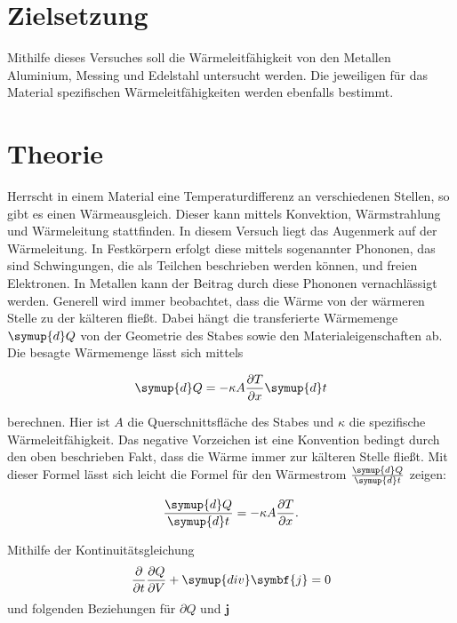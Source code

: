 \section{Zielsetzung}
Mithilfe dieses Versuches soll die Wärmeleitfähigkeit von den Metallen Aluminium, Messing und Edelstahl untersucht werden.
Die jeweiligen für das Material spezifischen Wärmeleitfähigkeiten werden ebenfalls bestimmt.


\section{Theorie}
\label{sec:Theorie}

Herrscht in einem Material eine Temperaturdifferenz an verschiedenen Stellen, so gibt es einen Wärmeausgleich.
Dieser kann mittels Konvektion, Wärmstrahlung und Wärmeleitung stattfinden. In diesem Versuch liegt das Augenmerk auf der Wärmeleitung.
In Festkörpern erfolgt diese mittels sogenannter Phononen, das sind Schwingungen, die als Teilchen beschrieben werden können, und freien Elektronen.
In Metallen kann der Beitrag durch diese Phononen vernachlässigt werden.
Generell wird immer beobachtet, dass die Wärme von der wärmeren Stelle zu der kälteren fließt.
Dabei hängt die transferierte Wärmemenge $\symup{d}Q$ von der Geometrie des Stabes sowie den Materialeigenschaften ab. Die besagte Wärmemenge lässt sich mittels

\begin{equation}
\label{eqn:waermemenge}
    \symup{d}Q = -\kappa A \frac{\partial T}{\partial x}\symup{d}t
\end{equation}

berechnen. Hier ist $A$ die Querschnittsfläche des Stabes und $\kappa$ die spezifische Wärmeleitfähigkeit. Das negative Vorzeichen ist eine Konvention bedingt durch den oben beschrieben Fakt, dass die Wärme immer zur kälteren Stelle fließt.
Mit dieser Formel lässt sich leicht die Formel für den Wärmestrom $\frac{\symup{d}Q}{\symup{d}t}$ zeigen:

\begin{equation}
\label{eqn:waermestrom}
    \frac{\symup{d}Q}{\symup{d}t} = -\kappa A \frac{\partial T}{\partial x}.
\end{equation}

Mithilfe der Kontinuitätsgleichung 
\begin{equation}
\label{eqn:kontinuitaet}
    \frac{\partial}{\partial t}\frac{\partial Q}{\partial V} + \symup{div} \symbf{j} = 0
\end{equation}
und folgenden Beziehungen für $\partial Q$ und $\symbf{j}$

